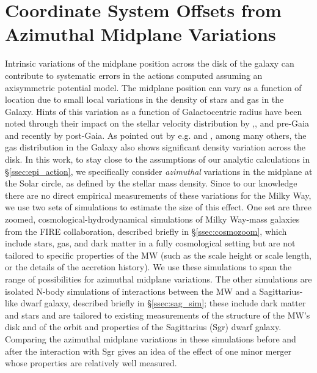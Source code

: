 \documentclass[twocolumn]{aastex62}
\begin{document}
\section{Coordinate System Offsets from Azimuthal Midplane Variations}
\label{sec:local_fire}

Intrinsic variations of the midplane position across the disk of the galaxy can contribute to systematic errors in the actions computed assuming an axisymmetric potential model. The midplane position can vary as a function of location due to small local variations in the density of stars and gas in the Galaxy. Hints of this variation as a function of Galactocentric radius have been noted through their impact on the stellar velocity distribution by \citet{2012ApJ...750L..41W},\citet{2013ApJ...777L...5C}, and \citet{2013MNRAS.436..101W} pre-Gaia and recently by \citet{2019arXiv190209569F} post-Gaia. As pointed out by e.g. \citet{2014ApJ...797...53G} and \citet{2019ApJ...871..145A}, among many others, the gas distribution in the Galaxy also shows significant density variation across the disk. In this work, to stay close to the assumptions of our analytic calculations in \S \ref{ssec:epi_action}, we specifically consider \emph{azimuthal} variations in the midplane at the Solar circle, as defined by the stellar mass density. Since to our knowledge there are no direct empirical measurements of these variations for the Milky Way, we use two sets of simulations to estimate the size of this effect. One set are three zoomed, cosmological-hydrodynamical simulations of Milky Way-mass galaxies from the FIRE collaboration, described briefly in \S \ref{ssec:cosmozoom}, which include stars, gas, and dark matter in a fully cosmological setting but are not tailored to specific properties of the MW (such as the scale height or scale length, or the details of the accretion history). We use these simulations to span the range of possibilities for azimuthal midplane variations. The other simulations are isolated N-body simulations of interactions between the MW and a Sagittarius-like dwarf galaxy, described briefly in \S \ref{ssec:sag_sim}; these include dark matter and stars and are tailored to existing measurements of the structure of the MW's disk and of the orbit and properties of the Sagittarius (Sgr) dwarf galaxy. Comparing the azimuthal midplane variations in these simulations before and after the interaction with Sgr gives an idea of the effect of one minor merger whose properties are relatively well measured. 
\end{document}

